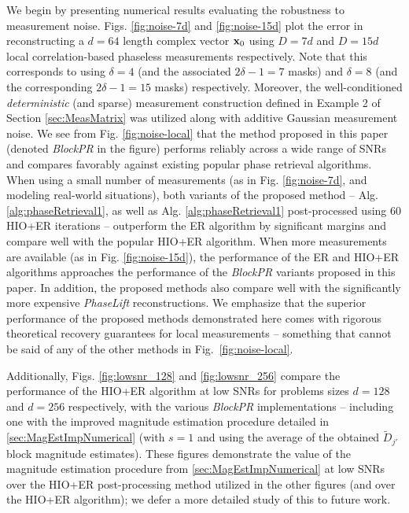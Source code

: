 We begin by presenting numerical results evaluating the robustness to measurement noise.  Figs. \ref{fig:noise-7d} and \ref{fig:noise-15d} plot the error in reconstructing a $d=64$ length complex vector $\mathbf x_0$ using $D=7d$ and $D=15d$ local correlation-based phaseless measurements respectively. Note that this corresponds to using $\delta=4$ (and the associated $2\delta-1=7$ masks) and $\delta=8$ (and the corresponding $2\delta-1=15$ masks) respectively. Moreover, the well-conditioned {\em deterministic} (and sparse) measurement construction defined in Example 2 of Section \ref{sec:MeasMatrix} was utilized along with additive Gaussian measurement noise. We see from Fig. \ref{fig:noise-local} that the method proposed in this paper (denoted {\em BlockPR} in the figure) performs reliably across a wide range of SNRs and compares favorably against existing popular phase retrieval algorithms. When using a small number of measurements (as in Fig.  \ref{fig:noise-7d}, and modeling real-world situations), both variants of the proposed method -- Alg. \ref{alg:phaseRetrieval1}, as well as Alg.  \ref{alg:phaseRetrieval1} post-processed using $60$ HIO+ER iterations -- outperform the ER algorithm by significant margins and compare well with the popular HIO+ER algorithm. When more measurements are available (as in Fig. \ref{fig:noise-15d}), the performance of the ER and HIO+ER algorithms approaches the performance of the {\em BlockPR} variants proposed in this paper. In addition, the proposed methods also compare well with the significantly more expensive {\em PhaseLift} reconstructions. We emphasize that the superior performance of the proposed methods demonstrated here comes with rigorous theoretical recovery guarantees for local measurements -- something that cannot be said of any of the other methods in Fig.~\ref{fig:noise-local}. 

Additionally, Figs. \ref{fig:lowsnr_128} and \ref{fig:lowsnr_256} compare the performance of the HIO+ER algorithm at low SNRs for problems sizes $d=128$ and $d=256$ respectively, with the various {\em BlockPR} implementations -- including one with the improved magnitude estimation procedure detailed in \cref{sec:MagEstImpNumerical} (with $s=1$ and using the average of the obtained $\tilde D_{j\prime}$ block magnitude estimates). These figures demonstrate the value of the magnitude estimation procedure from \cref{sec:MagEstImpNumerical} at low SNRs over the HIO+ER post-processing method utilized in the other figures (and over the HIO+ER algorithm); we defer a more detailed study of this to future work.

